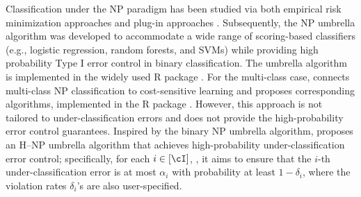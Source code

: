 Classification under the NP paradigm has been studied via both empirical risk minimization approaches \citep{casasent2003radial,scott2005comparison,han2008analysis} and plug-in approaches \citep{tong2013plug,zhao2016neyman}. Subsequently, the NP umbrella algorithm \citep{tong2018neyman} was developed to accommodate a wide range of scoring-based classifiers (e.g., logistic regression, random forests, and SVMs) while providing high probability Type I error control in binary classification. The umbrella algorithm is implemented in the widely used R package \href{https://cran.r-project.org/web/packages/nproc/index.html}{}.
For the multi-class case, \citep{tian2025neyman} connects multi-class NP classification to cost-sensitive learning and proposes corresponding algorithms, implemented in the R package \href{https://cran.r-project.org/web/packages/npcs/index.html}{}. However, this approach is not tailored to under-classification errors and does not provide the high-probability error control guarantees. Inspired by the binary NP umbrella algorithm, \cite{wang2024hierarchical} proposes an H--NP umbrella algorithm that achieves high-probability under-classification error control; specifically, for each $i \in [\cI]$, , it aims to ensure that the $i$-th under-classification error is at most 
$\alpha_i$
 with probability at least 
$1 - \delta_i$, where the violation rates $\delta_i$'s are also user-specified. 























